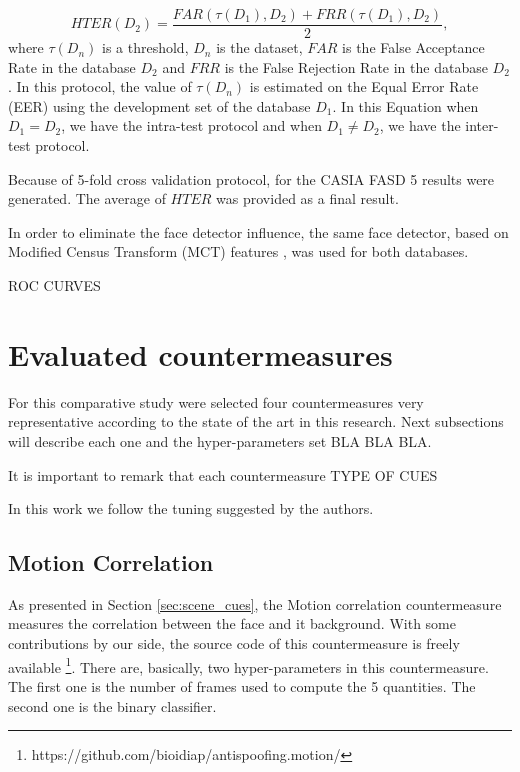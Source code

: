 \begin{equation}
\label{eq:HTER}
HTER(D_2)=\frac{FAR(\tau(D_1),D_2)+ FRR(\tau(D_1),D_2)} {2} ,
\end{equation}
where $\tau(D_n)$ is a threshold, $D_n$ is the dataset, $FAR$ is the False Acceptance Rate in the database $D_2$ and $FRR$ is the False Rejection Rate in the database $D_2$. In this protocol, the value of $\tau(D_n)$ is estimated on the Equal Error Rate (EER) using the development set of the database $D_1$. In this Equation when $D_1 = D_2$, we have the intra-test protocol and when $D_1 \neq D_2$, we have the inter-test protocol.

Because of 5-fold cross validation protocol, for the CASIA FASD 5 results were generated. The average of $HTER$ was provided as a final result.

In order to eliminate the face detector influence, the same face detector, based on Modified Census Transform (MCT) features \cite{froba2004face}, was used for both databases.

ROC CURVES

\section{Evaluated countermeasures}
\label{sec:Evaluated_countermeasures}

For this comparative study were selected four countermeasures very representative according to the state of the art in this research. Next subsections will describe each one and the hyper-parameters set BLA BLA BLA.

It is important to remark that each countermeasure TYPE OF CUES  

In this work we follow the tuning suggested by the authors.

\subsection{Motion Correlation}

As presented in Section \ref{sec:scene_cues}, the Motion correlation \cite{AnjosIJCB2011} countermeasure measures the correlation between the face and it background. With some contributions by our side, the source code of this countermeasure is freely available \footnote{https://github.com/bioidiap/antispoofing.motion/}. There are, basically, two hyper-parameters in this countermeasure. The first one is the number of frames used to compute the 5 quantities. The second one is the binary classifier.

